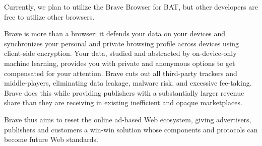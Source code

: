 \documentclass[11pt]{article}
\begin{document}
Currently, we plan to utilize the Brave Browser for \textrm{BAT}, but other developers are free to utilize other browsers. 

Brave is more than a browser: it defends your data on your devices and synchronizes your personal and private browsing profile across devices using client-side encryption. Your data, studied and abstracted by on-device-only machine learning, provides you with private and anonymous options to get compensated for your attention. Brave cuts out all third-party trackers and middle-players, eliminating data leakage, malware risk, and excessive fee-taking. Brave does this while providing publishers with a substantially larger revenue share than they are receiving in existing inefficient and opaque marketplaces. 

Brave thus aims to reset the online ad-based Web ecosystem, giving advertisers, publishers and customers a win-win solution whose components and protocols can become future Web standards.
\end{document}
